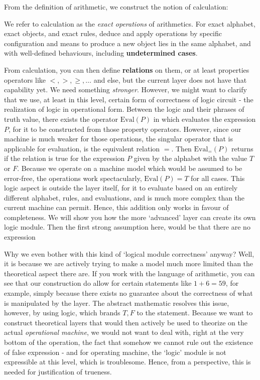 From the definition of arithmetic, we construct the notion of calculation:

\begin{definition}[Calculation]
    We refer to calculation as the \textit{exact operations} of arithmetics. For exact alphabet, exact objects, and exact rules, deduce and apply operations by specific configuration and means to produce a new object lies in the same alphabet, and with well-defined behaviours, including \textbf{undetermined cases}. 
\end{definition}

From calculation, you can then define \textbf{relations} on them, or at least properties operators like $<,>,\geq,\dots$ and else, but the current layer does not have that capability yet. We need something \textit{stronger}. However, we might want to clarify that we use, at least in this level, certain form of correctness of logic circuit - the realization of logic in operational form. Between the logic and their phrases of truth value, there exists the operator $\mathrm{Eval}(P)$ in which evaluates the expression $P$, for it to be constructed from those property operators. However, since our machine is much weaker for those operations, the singular operator that is applicable for evaluation, is the equivalent relation $=$. Then $\mathrm{Eval}_{=}(P)$ returns if the relation is true for the expression $P$ given by the alphabet with the value $T$ or $F$. Because we operate on a machine model which would be assumed to be error-free, the operations work spectacularly, $\mathrm{Eval}(P)=T$ for all cases. This logic aspect is outside the layer itself, for it to evaluate based on an entirely different alphabet, rules, and evaluations, and is much more complex than the current machine can permit. Hence, this addition only works in favour of completeness. We will show you how the more `advanced' layer can create its own logic module. Then the first strong assumption here, would be that there are no expression  

Why we even bother with this kind of `logical module correctness' anyway? Well, it is because we are actively trying to make a model much more limited than the theoretical aspect there are. If you work with the language of arithmetic, you can see that our construction do allow for certain statements like $1+6=59$, for example, simply because there exists no guarantee about the correctness of what is manipulated by the layer. The abstract mathematic resolves this issue, however, by using logic, which brands $T,F$ to the statement. Because we want to construct theoretical layers that would then actively be used to theorize on the actual \textit{operational machine}, we would not want to deal with, right at the very bottom of the operation, the fact that somehow we cannot rule out the existence of false expression - and for operating machine, the `logic' module is not expressible at this level, which is troublesome. Hence, from a perspective, this is needed for justification of trueness. 

